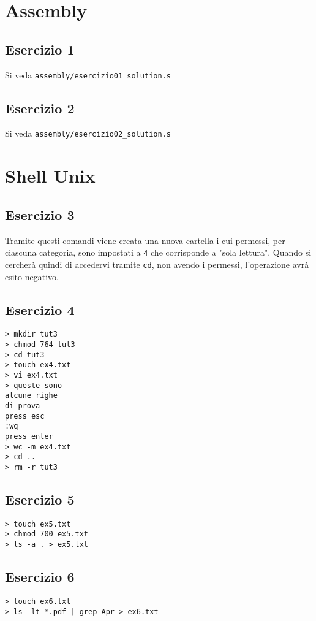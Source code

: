 \documentclass{article}
\def\code#1{\texttt{#1}}
\newcommand\tab[1][0.4cm]{\hspace*{#1}}
\begin{document}
\section*{Assembly}
\subsection*{Esercizio 1}
Si veda \code{assembly/esercizio01\_solution.s}

\subsection*{Esercizio 2}
Si veda \code{assembly/esercizio02\_solution.s}

\section*{Shell Unix}
\subsection*{Esercizio 3}
Tramite questi comandi viene creata una nuova cartella i cui permessi, per ciascuna categoria, sono impostati a \code{4} che corrisponde a "sola lettura". Quando si cercherà quindi di accedervi tramite \code{cd}, non avendo i permessi, l'operazione avrà esito negativo.

\subsection*{Esercizio 4}
\code{> mkdir tut3\\
> chmod 764 tut3\\
> cd tut3\\
> touch ex4.txt\\
> vi ex4.txt\\
> queste sono\\
\tab alcune righe\\
\tab di prova\\
press esc\\
:wq\\
press enter\\
> wc -m ex4.txt\\
> cd ..\\
> rm -r tut3
}

\subsection*{Esercizio 5}
\code{> touch ex5.txt\\
> chmod 700 ex5.txt\\
> ls -a . > ex5.txt
}

\subsection*{Esercizio 6}
\code{> touch ex6.txt\\
> ls -lt *.pdf | grep Apr > ex6.txt}
\end{document}
